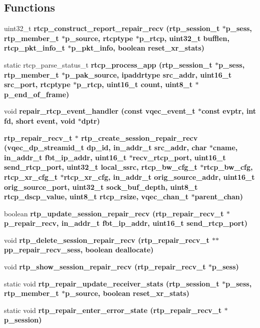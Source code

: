 \subsection*{Functions}
\begin{CompactItemize}
\item 
uint32\_\-t \bf{rtcp\_\-construct\_\-report\_\-repair\_\-recv} (rtp\_\-session\_\-t $\ast$p\_\-sess, rtp\_\-member\_\-t $\ast$p\_\-source, rtcptype $\ast$p\_\-rtcp, uint32\_\-t bufflen, rtcp\_\-pkt\_\-info\_\-t $\ast$p\_\-pkt\_\-info, boolean reset\_\-xr\_\-stats)
\item 
static rtcp\_\-parse\_\-status\_\-t \bf{rtcp\_\-process\_\-app} (rtp\_\-session\_\-t $\ast$p\_\-sess, rtp\_\-member\_\-t $\ast$p\_\-pak\_\-source, ipaddrtype src\_\-addr, uint16\_\-t src\_\-port, rtcptype $\ast$p\_\-rtcp, uint16\_\-t count, uint8\_\-t $\ast$p\_\-end\_\-of\_\-frame)
\item 
void \bf{repair\_\-rtcp\_\-event\_\-handler} (const vqec\_\-event\_\-t $\ast$const evptr, int fd, short event, void $\ast$dptr)
\item 
\bf{rtp\_\-repair\_\-recv\_\-t} $\ast$ \bf{rtp\_\-create\_\-session\_\-repair\_\-recv} (vqec\_\-dp\_\-streamid\_\-t dp\_\-id, in\_\-addr\_\-t src\_\-addr, char $\ast$cname, in\_\-addr\_\-t fbt\_\-ip\_\-addr, uint16\_\-t $\ast$recv\_\-rtcp\_\-port, uint16\_\-t send\_\-rtcp\_\-port, uint32\_\-t local\_\-ssrc, rtcp\_\-bw\_\-cfg\_\-t $\ast$rtcp\_\-bw\_\-cfg, rtcp\_\-xr\_\-cfg\_\-t $\ast$rtcp\_\-xr\_\-cfg, in\_\-addr\_\-t orig\_\-source\_\-addr, uint16\_\-t orig\_\-source\_\-port, uint32\_\-t sock\_\-buf\_\-depth, uint8\_\-t rtcp\_\-dscp\_\-value, uint8\_\-t rtcp\_\-rsize, \bf{vqec\_\-chan\_\-t} $\ast$parent\_\-chan)
\item 
boolean \bf{rtp\_\-update\_\-session\_\-repair\_\-recv} (\bf{rtp\_\-repair\_\-recv\_\-t} $\ast$p\_\-repair\_\-recv, in\_\-addr\_\-t fbt\_\-ip\_\-addr, uint16\_\-t send\_\-rtcp\_\-port)
\item 
void \bf{rtp\_\-delete\_\-session\_\-repair\_\-recv} (\bf{rtp\_\-repair\_\-recv\_\-t} $\ast$$\ast$pp\_\-repair\_\-recv\_\-sess, boolean deallocate)
\item 
void \bf{rtp\_\-show\_\-session\_\-repair\_\-recv} (\bf{rtp\_\-repair\_\-recv\_\-t} $\ast$p\_\-sess)
\item 
static void \bf{rtp\_\-repair\_\-update\_\-receiver\_\-stats} (rtp\_\-session\_\-t $\ast$p\_\-sess, rtp\_\-member\_\-t $\ast$p\_\-source, boolean reset\_\-xr\_\-stats)
\item 
static void \bf{rtp\_\-repair\_\-enter\_\-error\_\-state} (\bf{rtp\_\-repair\_\-recv\_\-t} $\ast$p\_\-session)
$$
\end{CompactItemize}
